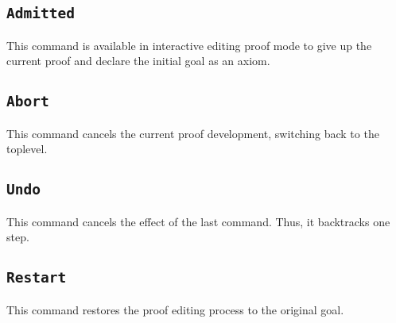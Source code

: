 \subsection{\tt Admitted}
This command is available in interactive editing proof mode to give up the current proof and declare the initial goal as an axiom.

\subsection{\tt Abort}
This command cancels the current proof development,
switching back to the toplevel.

\subsection{\tt Undo}
This command cancels the effect of the last command. Thus, it backtracks one step.

\subsection{\tt Restart}
This command restores the proof editing process to the original goal.

